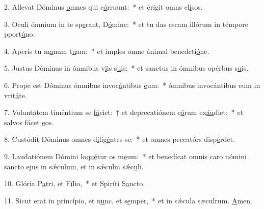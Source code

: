 2. Allevat Dóminus \uline{o}mnes qui c\uline{ó}rruunt:~* et érigit omns el\uline{í}sos.\par 
3. Oculi ómnium in te sp\uline{e}rant, D\uline{ó}mine:~* et tu das escam illórum in témpore pport\uline{ú}no.\par 
4. Aperis tu m\uline{a}num t\uline{u}am:~* et imples omne ánimal benedcti\uline{ó}ne.\par 
5. Justus Dóminus in ómnibus v\uline{i}is s\uline{u}is:~* et sanctus in ómnibus opérbus s\uline{u}is.\par 
6. Prope est Dóminus ómnibus invoc\uline{á}ntibus \uline{e}um:~* ómnibus invocántibus eum in vrit\uline{á}te.\par 
7. Voluntátem timéntium se \uline{fá}ciet:~† et deprecatiónem e\uline{ó}rum ex\uline{áu}diet:~* et salvos fácet \uline{e}os.\par 
8. Custódit Dóminus omnes d\uline{i}lig\uline{é}ntes se:~* et omnes peccatórs disp\uline{é}rdet.\par 
9. Laudatiónem Dómini lo\uline{qué}tur os m\uline{e}um:~* et benedícat omnis caro nómini sancto ejus in sǽculum, et in sǽculm sǽc\uline{u}li.\par 
10. Glória P\uline{a}tri, et F\uline{í}lio,~* et Spiríti S\uline{a}ncto.\par 
11. Sicut erat in princípio, et n\uline{u}nc, et s\uline{e}mper,~* et in sǽcula sæculrum. \uline{A}men.\par 
